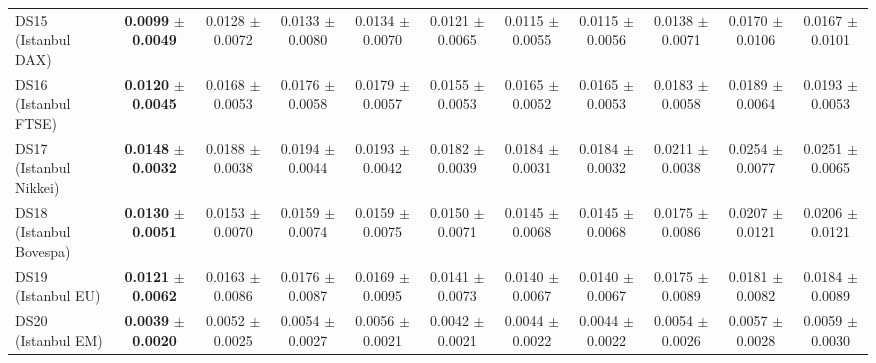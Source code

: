 \begin{table}[t]
{{\begin{tabular}{lcccccccccc}
DS15 (Istanbul DAX) & \textbf{0.0099} $\pm$ \textbf{0.0049} & 0.0128 $\pm$ 0.0072 & 0.0133 $\pm$ 0.0080 & 0.0134 $\pm$ 0.0070 & 0.0121 $\pm$ 0.0065 & 0.0115 $\pm$ 0.0055 & 0.0115 $\pm$ 0.0056 & 0.0138 $\pm$ 0.0071 & 0.0170 $\pm$ 0.0106 & 0.0167 $\pm$ 0.0101 \\
DS16 (Istanbul FTSE) & \textbf{0.0120} $\pm$ \textbf{0.0045} & 0.0168 $\pm$ 0.0053 & 0.0176 $\pm$ 0.0058 & 0.0179 $\pm$ 0.0057 & 0.0155 $\pm$ 0.0053 & 0.0165 $\pm$ 0.0052 & 0.0165 $\pm$ 0.0053 & 0.0183 $\pm$ 0.0058 & 0.0189 $\pm$ 0.0064 & 0.0193 $\pm$ 0.0053 \\
DS17 (Istanbul Nikkei) & \textbf{0.0148} $\pm$ \textbf{0.0032} & 0.0188 $\pm$ 0.0038 & 0.0194 $\pm$ 0.0044 & 0.0193 $\pm$ 0.0042 & 0.0182 $\pm$ 0.0039 & 0.0184 $\pm$ 0.0031 & 0.0184 $\pm$ 0.0032 & 0.0211 $\pm$ 0.0038 & 0.0254 $\pm$ 0.0077 & 0.0251 $\pm$ 0.0065 \\
DS18 (Istanbul Bovespa) & \textbf{0.0130} $\pm$ \textbf{0.0051} & 0.0153 $\pm$ 0.0070 & 0.0159 $\pm$ 0.0074 & 0.0159 $\pm$ 0.0075 & 0.0150 $\pm$ 0.0071 & 0.0145 $\pm$ 0.0068 & 0.0145 $\pm$ 0.0068 & 0.0175 $\pm$ 0.0086 & 0.0207 $\pm$ 0.0121 & 0.0206 $\pm$ 0.0121 \\
DS19 (Istanbul EU) & \textbf{0.0121} $\pm$ \textbf{0.0062} & 0.0163 $\pm$ 0.0086 & 0.0176 $\pm$ 0.0087 & 0.0169 $\pm$ 0.0095 & 0.0141 $\pm$ 0.0073 & 0.0140 $\pm$ 0.0067 & 0.0140 $\pm$ 0.0067 & 0.0175 $\pm$ 0.0089 & 0.0181 $\pm$ 0.0082 & 0.0184 $\pm$ 0.0089 \\
DS20 (Istanbul EM) & \textbf{0.0039} $\pm$ \textbf{0.0020} & 0.0052 $\pm$ 0.0025 & 0.0054 $\pm$ 0.0027 & 0.0056 $\pm$ 0.0021 & 0.0042 $\pm$ 0.0021 & 0.0044 $\pm$ 0.0022 & 0.0044 $\pm$ 0.0022 & 0.0054 $\pm$ 0.0026 & 0.0057 $\pm$ 0.0028 & 0.0059 $\pm$ 0.0030 \\
\bottomrule
\end{tabular}%
}%
}
\end{table}
